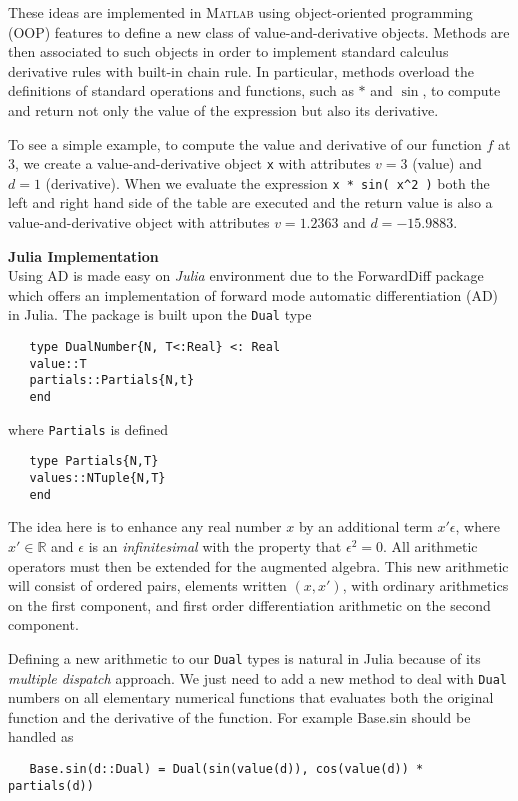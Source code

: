 \documentclass[a4paper,11pt]{article}  %
\begin{document}
These ideas are implemented in \textsc{Matlab} using object-oriented programming (OOP) features to define a new class of value-and-derivative objects. Methods are then associated
to such objects in order to implement standard calculus derivative rules with built-in chain rule.
In particular, methods overload the definitions of standard operations and functions, such as $*$ and $\sin$,
to compute and return not only the value of the expression but also its derivative.

To see a simple example, to compute the value and derivative of our function $f$ at 3, we create a
value-and-derivative object \texttt{x} with attributes $v =3$ (value) and $d=1$ (derivative). When we evaluate
the expression \texttt{x * sin( x\^{}2 )} both the left and right hand side of the table are executed and the return value
is also a value-and-derivative object with attributes $v=1.2363$ and $d = −15.9883$.

\textbf{Julia Implementation} \\
Using AD is made easy on \emph{Julia} environment due to the ForwardDiff package which offers an implementation
of forward mode automatic differentiation (AD) in Julia. The package is built upon the \texttt{Dual} type

\begin{verbatim}
   type DualNumber{N, T<:Real} <: Real
   value::T
   partials::Partials{N,t}
   end
\end{verbatim}
where \texttt{Partials} is defined
\begin{verbatim}
   type Partials{N,T}
   values::NTuple{N,T}
   end
\end{verbatim}

The idea here is to enhance any real number $x$ by an additional term $ x' \epsilon $, where $ x'\in \mathbb{R} $ and $ \epsilon $ is an
\emph{infinitesimal} with the property that $ \epsilon^2 =0 $.
All arithmetic operators must then be extended for the augmented algebra.
This new arithmetic will consist of ordered pairs, elements written $ ( x,x') $,
with ordinary arithmetics on the first component, and first order differentiation arithmetic on
the second component.

Defining a new arithmetic to our \texttt{Dual} types is natural in Julia because of its \emph{multiple dispatch} approach.
We just need to add a new method to deal with \texttt{Dual} numbers on all elementary numerical functions
that evaluates both the original function and the derivative of the function. For example
Base.sin should be handled as
\begin{verbatim}
   Base.sin(d::Dual) = Dual(sin(value(d)), cos(value(d)) * partials(d))
\end{verbatim}
\end{document}
